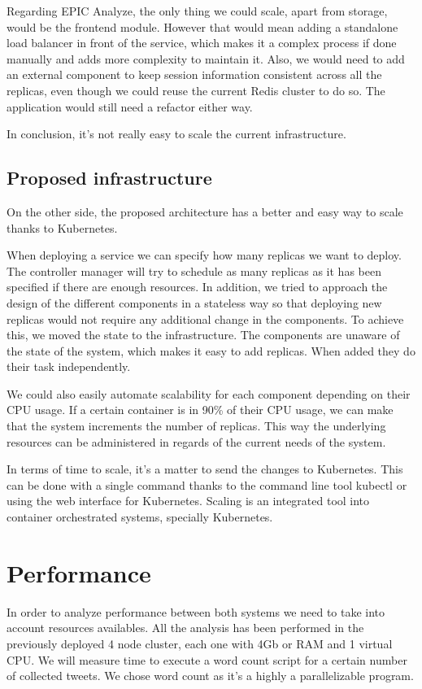 Regarding EPIC Analyze, the only thing we could scale, apart from storage, would be the frontend module. However that would mean adding a standalone load balancer in front of the service, which makes it a complex process if done manually and adds more complexity to maintain it. Also, we would need to add an external component to keep session information consistent across all the replicas, even though we could reuse the current Redis cluster to do so. The application would still need a refactor either way. 

In conclusion, it’s not really easy to scale the current infrastructure.

\subsection{Proposed infrastructure}

On the other side, the proposed architecture has a better and easy way to scale thanks to Kubernetes.

When deploying a service we can specify how many replicas we want to deploy. The controller manager will try to schedule as many replicas as it has been specified if there are enough resources. In addition, we tried to approach the design of the different components in a stateless way so that deploying new replicas would not require any additional change in the components. To achieve this, we moved the state to the infrastructure. The components are unaware of the state of the system, which makes it easy to add replicas. When added they do their task independently.

We could  also easily automate scalability  for each component depending on their CPU usage. If a certain container is in 90\% of their CPU usage, we can make that the system increments the number of replicas. This way the underlying resources can be administered in regards of the current needs of the system.

In terms of time to scale, it’s a matter to send the changes to Kubernetes. This can be done with a single command thanks to the command line tool kubectl or using the web interface for Kubernetes. Scaling is an integrated tool into container orchestrated systems, specially Kubernetes.

\section{Performance}

In order to analyze performance between both systems we need to take into account resources availables. All the analysis has been performed in the previously deployed 4 node cluster, each one with 4Gb or RAM and 1 virtual CPU. We will measure time to execute a word count script for a  certain number of collected tweets. We chose word count as it’s a highly a parallelizable program. 

